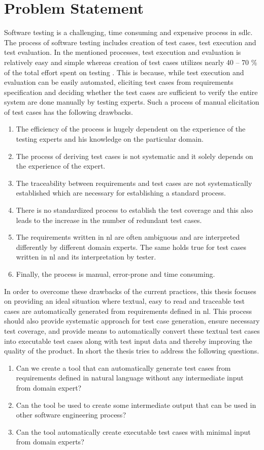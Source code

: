 \section{Problem Statement}
Software testing is a challenging, time consuming and expensive process in \gls{sdlc}. The process of software testing includes creation of test cases, test execution and test evaluation. In the mentioned processes, test execution and evaluation is relatively easy and simple whereas creation of test cases utilizes nearly 40 – 70 \% of the total effort spent on testing \cite{kulkarni2014generating}. This is because, while test execution and evaluation can be easily automated, eliciting test cases from requirements specification and deciding whether the test cases are sufficient to verify the entire system are done manually by testing experts. Such a process of manual elicitation of test cases has the following drawbacks.
\begin{enumerate}
\item The efficiency of the process is hugely dependent on the experience of the testing experts and his knowledge on the particular domain.
\item The process of deriving test cases is not systematic and it solely depends on the experience of the expert.
\item The traceability between requirements and test cases are not systematically established which are necessary for establishing a standard process.
\item There is no standardized process to establish the test coverage and this also leads to the increase in the number of redundant test cases.
\item The requirements written in \gls{nl} are often ambiguous and are interpreted differently by different domain experts. The same holds true for test cases written in \gls{nl} and its interpretation by tester.
\item Finally, the process is manual, error-prone and time consuming.
\end{enumerate}
In order to overcome these drawbacks of the current practices, this thesis focuses on providing an ideal situation where textual, easy to read and traceable test cases are automatically generated from requirements defined in \gls{nl}. This process should also provide systematic approach for test case generation, ensure necessary test coverage, and provide means to automatically convert these textual test cases into executable test cases along with test input data and thereby improving the quality of the product. In short the thesis tries to address the following questions.
\begin{enumerate}
\item Can we create a tool that can automatically generate test cases from requirements defined in natural language without any intermediate input from domain expert?
\item Can the tool be used to create some intermediate output that can be used in other software engineering process?
\item Can the tool automatically create executable test cases with minimal input from domain experts?
\end{enumerate}
